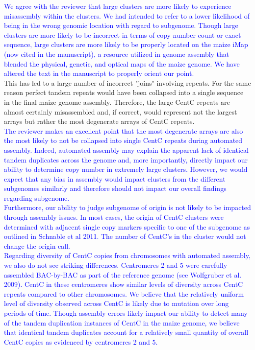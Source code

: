\documentclass[]{article}
\newcommand{\res}[1]{\noindent \textcolor{blue}{{#1}} \\}
\begin{document}
\res{We agree with the reviewer that large clusters are more likely to experience misassembly within the clusters.  
We had intended to refer to a lower likelihood of being in the wrong genomic location with regard to subgenome.  
Though large clusters are more likely to be incorrect in terms of copy number count or exact sequence, large clusters are more likely to be properly located on the maize iMap (now cited in the manuscript), a resource utilized in genome assembly that blended the physical, genetic, and optical maps of the maize genome.  
We have altered the text in the manuscript to properly orient our point.}

This has led to a large number of incorrect "joins" involving repeats.  
For the same reason perfect tandem repeats would have been collapsed into a single sequence in the final maize genome assembly.  
Therefore, the large CentC repeats are almost certainly misassembled and, if correct, would represent not the largest arrays but rather the most degenerate arrays of CentC repeats.\\

\res{The reviewer makes an excellent point that the most degenerate arrays are also the most likely to not be collapsed into single CentC repeats during automated assembly.
Indeed, automated assembly may explain the apparent lack of identical tandem duplicates across the genome and, more importantly, directly impact our ability to determine copy number in extremely large clusters.  
However, we would expect that any bias in assembly would impact clusters from the different subgenomes similarly and therefore should not impact our overall findings regarding subgenome.  }

\res{Furthermore, our ability to judge subgenome of origin is not likely to be impacted through assembly issues. In most cases, the origin of CentC clusters were determined with adjacent single copy markers specific to one of the subgenome as outlined in Schnable et al 2011.  The number of CentC's in the cluster would not change the origin call.}

\res{Regarding diversity of CentC copies from chromosomes with automated assembly, we also do not see striking differences.  
Centromeres 2 and 5 were carefully assembled BAC-by-BAC as part of the reference genome (see Wolfgruber et al. 2009).  CentC in these centromeres  show similar levels of diversity across CentC repeats compared to other chromosomes.  
We believe that the relatively uniform level of diversity observed across CentC is likely due to mutation over long periods of time.  
Though assembly errors likely impact our ability to detect many of the tandem duplication instances of CentC in the maize genome, we believe that identical tandem duplicates account for a relatively small quantity of overall CentC copies as evidenced by centromeres 2 and 5. }
\end{document}
